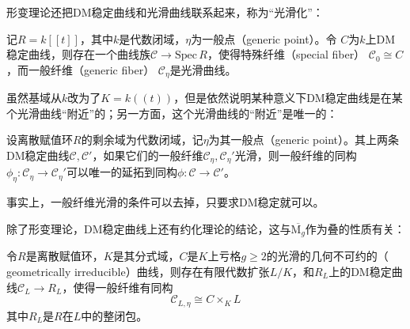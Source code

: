 形变理论还把DM稳定曲线和光滑曲线联系起来，称为“光滑化”：
\begin{lemma}\label{smoothing}
	记$ R=k[[t]]$，其中$ k $是代数闭域，$ \eta $为一般点（generic point）。令 $ C $为$ k $上DM稳定曲线，则存在一个曲线族$ \mathcal{C}\to \mathrm{Spec}\,R $，使得特殊纤维（special fiber） $ \mathcal{C}_0\cong C $，而一般纤维（generic fiber） $ \mathcal{C}_\eta $是光滑曲线。
\end{lemma}
虽然基域从$ k $改为了$ K=k((t)) $，但是依然说明某种意义下DM稳定曲线是在某个光滑曲线“附近”的；另一方面，这个光滑曲线的“附近”是唯一的：
\begin{lemma}\label{DeformationforCurves}
	设离散赋值环$ R $的剩余域为代数闭域，记$ \eta $为其一般点（generic point）。其上两条DM稳定曲线$ \mathcal{C},\mathcal{C}' $，如果它们的一般纤维$ \mathcal{C}_\eta,\mathcal{C}_\eta ' $光滑，则一般纤维的同构$ \phi_\eta :\mathcal{C}_\eta \to \mathcal{C}_\eta'  $可以唯一的延拓到同构$ \phi :\mathcal{C} \to \mathcal{C}'  $。
\end{lemma}
事实上，一般纤维光滑的条件可以去掉，只要求DM稳定就可以。

除了形变理论，DM稳定曲线上还有约化理论的结论，这与$ \overline{\mathrm{M}_g} $作为叠的性质有关：
\begin{lemma}\label{reduction}
	令$ R $是离散赋值环，$ K $是其分式域，$ C $是$ K $上亏格$ g\geqslant2 $的光滑的几何不可约的（ geometrically irreducible）曲线，则存在有限代数扩张$ L/K $，和$ R_L $上的DM稳定曲线$ \mathcal{C}_L\to R_L $，使得一般纤维有同构
	$$ \mathcal{C}_{L,\eta}\cong C\times_KL  $$
	其中$ R_L $是$ R $在$ L $中的整闭包。
\end{lemma}


